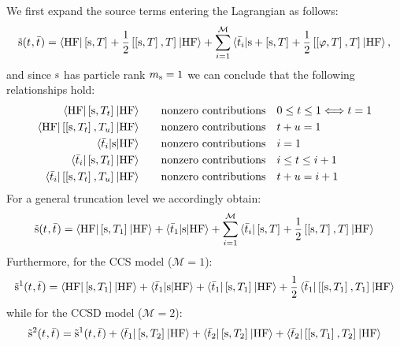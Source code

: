 We first expand the source terms entering the Lagrangian as follows:
\begin{equation}
  \tilde{\mathrm{s}}(t_{}, \bar{t}_{}) =
  \braket{\mathrm{HF} | \left[ \mathrm{s}, T \right]^{} + \frac{1}{2}\left[ \left[ \mathrm{s}, T \right]^{}, T \right]^{} | \mathrm{HF}}
  + \sum_{i=1}^{\mathcal{M}}\braket{\bar{t}_{i} | \mathrm{s} + \left[ \mathrm{s}, T \right]^{} +
  \frac{1}{2}\left[ \left[ \varphi, T \right]^{}, T \right]^{} | \mathrm{HF}},
\end{equation}
and since $\mathrm{s}$ has particle rank $m_{\mathrm{s}} = 1$ we can conclude that the
following relationships hold:
\begin{subequations}
\begin{align}
  \braket{\mathrm{HF} |
  \left[ \mathrm{s}, T_t \right]^{}
  | \mathrm{HF}}
  &\quad\quad\text{nonzero contributions} \quad 0 \leq t \leq 1
  \Longleftrightarrow t = 1 \\
  \braket{\mathrm{HF} |
  \left[ \left[ \mathrm{s}, T_t \right]^{}, T_u \right]^{}
  | \mathrm{HF}}
  &\quad\quad\text{nonzero contributions} \quad t + u = 1 \\
  \braket{\bar{t}_{i} |
  \mathrm{s}
  | \mathrm{HF} }
  &\quad\quad\text{nonzero contributions} \quad i = 1 \\
  \braket{\bar{t}_{i} |
  \left[ \mathrm{s}, T_t \right]^{}
  | \mathrm{HF} }
  &\quad\quad\text{nonzero contributions} \quad i \leq t \leq i + 1 \\
  \braket{\bar{t}_{i} |
  \left[ \left[ \mathrm{s}, T_t \right]^{}, T_u \right]^{}
  | \mathrm{HF} }
  &\quad\quad\text{nonzero contributions} \quad t + u = i + 1
\end{align}
\end{subequations}
For a general truncation level we accordingly obtain:
\begin{equation}\label{eq:source-term}
  \tilde{\mathrm{s}}(t_{}, \bar{t}_{}) =
  \braket{\mathrm{HF} | \left[ \mathrm{s}, T_1 \right]^{} | \mathrm{HF}}
  + \braket{\bar{t}_{1} | \mathrm{s} | \mathrm{HF}}
  + \sum_{i=1}^{\mathcal{M}}\braket{\bar{t}_{i} | \left[ \mathrm{s}, T \right]^{} + \frac{1}{2}\left[ \left[ \mathrm{s}, T \right]^{}, T \right]^{} | \mathrm{HF}}
\end{equation}
Furthermore, for the \acs{CCS} model ($\mathcal{M} = 1$):
\begin{equation}
  \tilde{\mathrm{s}}^1(t_{}, \bar{t}_{}) =
  \braket{\mathrm{HF} | \left[ \mathrm{s}, T_1 \right]^{} | \mathrm{HF}}
  + \braket{\bar{t}_{1} | \mathrm{s} | \mathrm{HF}}
  + \braket{\bar{t}_{1} | \left[ \mathrm{s}, T_1 \right]^{} | \mathrm{HF}}
  + \frac{1}{2}\braket{\bar{t}_{1} | \left[ \left[ \mathrm{s}, T_1 \right]^{}, T_1 \right]^{} | \mathrm{HF}}
\end{equation}
while for the \acs{CCSD} model ($\mathcal{M} = 2$):
\begin{equation}
  \tilde{\mathrm{s}}^2(t_{}, \bar{t}_{}) =
  \tilde{\mathrm{s}}^1(t_{}, \bar{t}_{})
  + \braket{\bar{t}_{1} | \left[ \mathrm{s}, T_2 \right]^{} | \mathrm{HF}}
  + \braket{\bar{t}_{2} | \left[ \mathrm{s}, T_2 \right]^{} | \mathrm{HF}}
  + \braket{\bar{t}_{2} | \left[ \left[ \mathrm{s}, T_1 \right]^{}, T_2 \right]^{} | \mathrm{HF}}
\end{equation}
